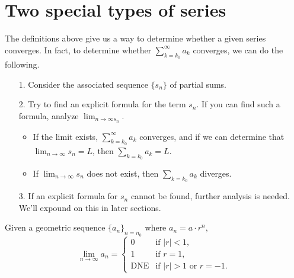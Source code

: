 \documentclass{ximera}
\begin{document}
%
%

\section{Two special types of series}
The definitions above give us a way to determine whether a given series converges.  In fact, to determine whether $\sum_{k=k_0}^{\infty} a_k$ converges, we can do the following.

\begin{itemize}
\item[1.] Consider the associated sequence $\{s_n\}$ of partial sums.
\item[2.] Try to find an explicit formula for the term $s_n$.  If you can find such a formula, analyze $\lim_{n \to \infty s_n}$.  
\begin{itemize}
\item If the limit exists, $\sum_{k=k_0}^{\infty} a_k$ converges, and if we can determine that $\lim_{n \to \infty} s_n =L$, then $\sum_{k=k_0} a_k=L$.  \item If  $\lim_{n \to \infty} s_n$ does not exist, then $\sum_{k=k_0} a_k$ diverges.
\end{itemize}
\item[3.] If an explicit formula for $s_n$ cannot be found, further analysis is needed.  We'll expound on this in later sections.
\end{itemize}


\begin{theorem}
  Given a geometric sequence $\{a_n\}_{n=n_0}$ where $a_n = a \cdot r^{n}$,
  \[
  \lim_{n\to\infty} a_n =
  \begin{cases}
    0 &\text{if $|r|<1$,}\\
    1 &\text{if $r=1$,}\\
    \text{DNE} &\text{if $|r|>1$ or $r=-1$.}
  \end{cases}
  \]
\end{theorem}
\end{document}
